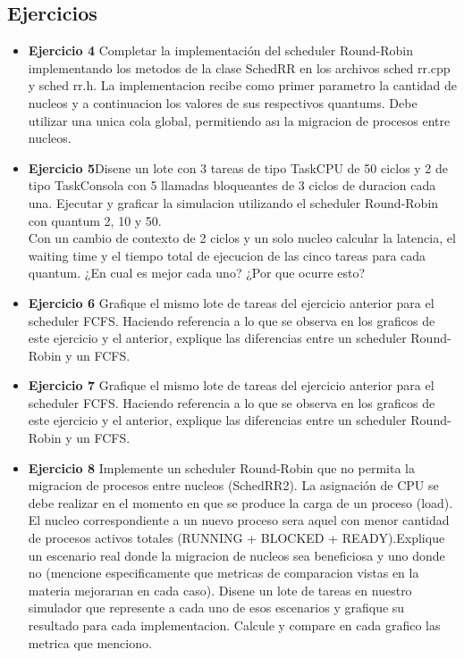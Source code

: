
\subsection{Ejercicios}
\begin{itemize}
 \item 
\textbf{Ejercicio 4}  Completar la implementación del scheduler Round-Robin implementando los
metodos de la clase SchedRR en los archivos sched rr.cpp y sched rr.h. La implementacion
recibe como primer parametro la cantidad de nucleos y a continuacion los valores de sus
respectivos quantums. Debe utilizar una unica cola global, permitiendo ası la migracion de
procesos entre nucleos.
\item \textbf{Ejercicio 5}Disene un lote con 3 tareas de tipo TaskCPU de 50 ciclos y 2 de tipo TaskConsola
con 5 llamadas bloqueantes de 3 ciclos de duracion cada una. Ejecutar y graficar la simulacion
utilizando el scheduler Round-Robin con quantum 2, 10 y 50.\\
Con un cambio de contexto de 2 ciclos y un solo nucleo calcular la latencia, el waiting
time y el tiempo total de ejecucion de las cinco tareas para cada quantum. 
¿En cual es mejor cada uno? ¿Por que ocurre esto?
\item \textbf{Ejercicio 6} Grafique el mismo lote de tareas del ejercicio anterior para el scheduler FCFS.
Haciendo referencia a lo que se observa en los graficos de este ejercicio y el anterior, explique
las diferencias entre un scheduler Round-Robin y un FCFS.
\item \textbf{Ejercicio 7} Grafique el mismo lote de tareas del ejercicio anterior para el scheduler FCFS.
Haciendo referencia a lo que se observa en los graficos de este ejercicio y el anterior, explique
las diferencias entre un scheduler Round-Robin y un FCFS.
\item \textbf{Ejercicio 8} Implemente un scheduler Round-Robin que no permita la migracion de procesos
entre nucleos (SchedRR2). La asignación de CPU se debe realizar en el momento en que se produce la carga 
de un proceso (load). El nucleo correspondiente a un nuevo proceso sera aquel
con menor cantidad de procesos activos totales (RUNNING + BLOCKED + READY).Explique un escenario real 
donde la migracion de nucleos sea beneficiosa y uno donde no (mencione
especificamente que metricas de comparacion vistas en la materia mejorarıan en cada caso).
Disene un lote de tareas en nuestro simulador que represente a cada uno de esos escenarios
y grafique su resultado para cada implementacion. Calcule y compare en cada grafico las
metrica que menciono.

\end{itemize}


